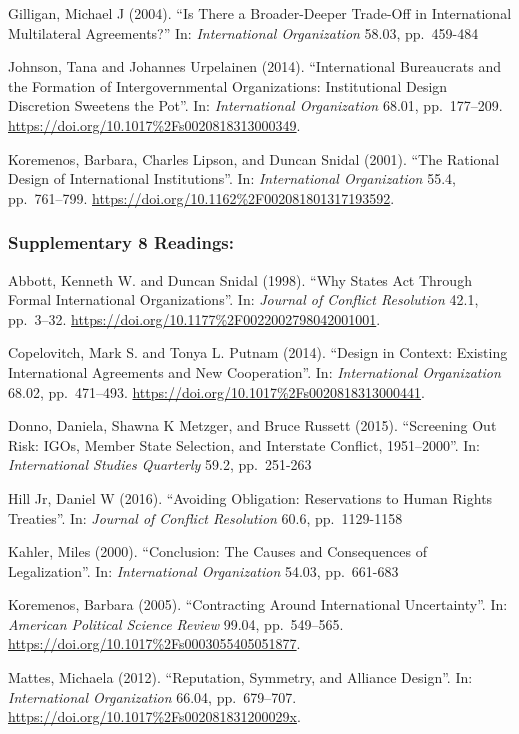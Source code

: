 \documentclass[10pt,]{article}
\begin{document}
Gilligan, Michael J (2004). ``Is There a Broader-Deeper Trade-Off in
International Multilateral Agreements?'' In:
\emph{International Organization} 58.03, pp.~459-484

Johnson, Tana and Johannes Urpelainen (2014). ``International
Bureaucrats and the Formation of Intergovernmental Organizations:
Institutional Design Discretion Sweetens the Pot''. In:
\emph{International Organization} 68.01, pp.~177--209.
\url{https://doi.org/10.1017\%2Fs0020818313000349}.

Koremenos, Barbara, Charles Lipson, and Duncan Snidal (2001). ``The
Rational Design of International Institutions''. In:
\emph{International Organization} 55.4, pp.~761--799.
\url{https://doi.org/10.1162\%2F002081801317193592}.

\subsubsection{Supplementary \textbar{} 8
Readings:}\label{supplementary-8-readings}

Abbott, Kenneth W. and Duncan Snidal (1998). ``Why States Act Through
Formal International Organizations''. In:
\emph{Journal of Conflict Resolution} 42.1, pp.~3--32.
\url{https://doi.org/10.1177\%2F0022002798042001001}.

Copelovitch, Mark S. and Tonya L. Putnam (2014). ``Design in Context:
Existing International Agreements and New Cooperation''. In:
\emph{International Organization} 68.02, pp.~471--493.
\url{https://doi.org/10.1017\%2Fs0020818313000441}.

Donno, Daniela, Shawna K Metzger, and Bruce Russett (2015). ``Screening
Out Risk: IGOs, Member State Selection, and Interstate Conflict,
1951--2000''. In: \emph{International Studies Quarterly} 59.2,
pp.~251-263

Hill Jr, Daniel W (2016). ``Avoiding Obligation: Reservations to Human
Rights Treaties''. In: \emph{Journal of Conflict Resolution} 60.6,
pp.~1129-1158

Kahler, Miles (2000). ``Conclusion: The Causes and Consequences of
Legalization''. In: \emph{International Organization} 54.03, pp.~661-683

Koremenos, Barbara (2005). ``Contracting Around International
Uncertainty''. In: \emph{American Political Science Review} 99.04,
pp.~549--565. \url{https://doi.org/10.1017\%2Fs0003055405051877}.

Mattes, Michaela (2012). ``Reputation, Symmetry, and Alliance Design''.
In: \emph{International Organization} 66.04, pp.~679--707.
\url{https://doi.org/10.1017\%2Fs002081831200029x}.
\end{document}
